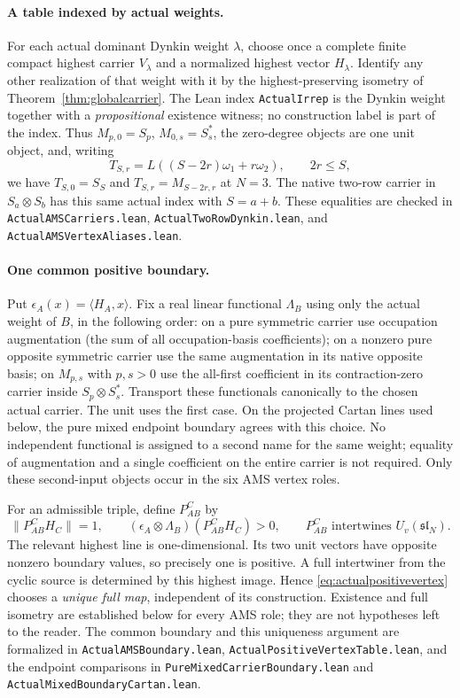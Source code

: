 \documentclass[10pt,a4paper]{article}
\newcommand{\lean}[1]{{\small\nolinkurl{#1}}}
\newenvironment{revision}{\begingroup}{\endgroup}
\begin{document}
\begin{revision}
\paragraph{A table indexed by actual weights.}
For each actual dominant Dynkin weight $\lambda$, choose once a complete
finite compact highest carrier $V_\lambda$ and a normalized highest
vector $H_\lambda$. Identify any other realization of that weight with
it by the highest-preserving isometry of
Theorem~\ref{thm:globalcarrier}. The Lean index
\lean{ActualIrrep} is the Dynkin weight together with a
\emph{propositional} existence witness; no construction label is part
of the index. Thus $M_{p,0}=S_p$, $M_{0,s}=S_s^*$, the zero-degree
objects are one unit object, and, writing
\[
 T_{S,r}=L((S-2r)\omega _1+r\omega _2),\qquad 2r\le S,
\]
we have $T_{S,0}=S_S$ and $T_{S,r}=M_{S-2r,r}$ at $N=3$.
The native two-row carrier in $S_a\otimes S_b$ has this same actual
index with $S=a+b$. These equalities are checked in
\lean{ActualAMSCarriers.lean}, \lean{ActualTwoRowDynkin.lean}, and
\lean{ActualAMSVertexAliases.lean}.

\paragraph{One common positive boundary.}
Put $\epsilon_A(x)=\langle H_A,x\rangle$. Fix a real linear functional
$\Lambda_B$ using only the actual weight of $B$, in the following
order: on a pure symmetric carrier use occupation augmentation
(the sum of all occupation-basis coefficients); on a nonzero pure
opposite symmetric carrier use the same augmentation in its native
opposite basis; on $M_{p,s}$ with $p,s>0$ use the all-first coefficient
in its contraction-zero carrier inside $S_p\otimes S_s^*$.
Transport these functionals canonically to the chosen actual carrier.
The unit uses the first case. On the projected Cartan lines used
below, the pure mixed endpoint boundary agrees with this choice.
No independent functional is assigned to a second name for the same
weight; equality of augmentation and a single coefficient on the
entire carrier is not required.
Only these second-input objects occur in the six AMS vertex roles.

For an admissible triple, define $P_{AB}^{C}$ by
\begin{equation}\label{eq:actualpositivevertex}
 \|P_{AB}^{C}H_C\|=1,\qquad
 (\epsilon_A\otimes\Lambda_B)(P_{AB}^{C}H_C)>0,
 \qquad P_{AB}^{C}\text{ intertwines }U_v(\mathfrak{sl}_N).
\end{equation}
The relevant highest line is one-dimensional. Its two unit vectors
have opposite nonzero boundary values, so precisely one is positive.
A full intertwiner from the cyclic source is determined by this
highest image. Hence \eqref{eq:actualpositivevertex} chooses a
\emph{unique full map}, independent of its construction. Existence
and full isometry are established below for every AMS role; they are
not hypotheses left to the reader. The common boundary and this
uniqueness argument are formalized in
\lean{ActualAMSBoundary.lean}, \lean{ActualPositiveVertexTable.lean},
and the endpoint comparisons in
\lean{PureMixedCarrierBoundary.lean} and
\lean{ActualMixedBoundaryCartan.lean}.


\end{revision}
\end{document}
